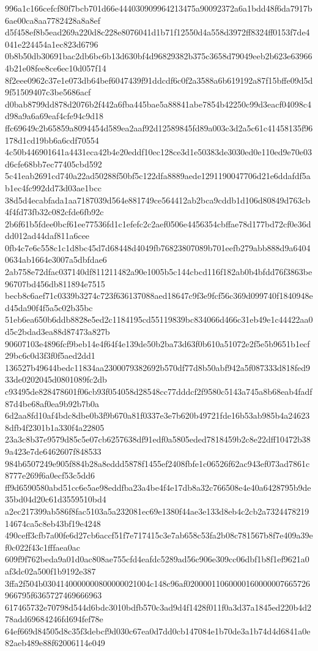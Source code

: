 {996a1c166cefcf80f7bcb701d66e444030909964213475a90092372a6a1bdd48f6da7917b6ae00ca8aa7782428a8a8ef
d5f458ef8b5ead269a220d8c228e8076041d1b71f12550d4a558d3972ff8324ff0153f7de4041e224454a1ec823d6796
0b8b50db30691bac2db6bc6b13d630bf4d96829382b375c3658d79049eeb2b623e639664b21e08fee8ce6ec10d057f14
8f2eee0962c37e1e073db64bef6047439f91ddcdf6c0f2a3588a6b619192a87f15bffe09d5d9f51509407c3be5686acf
d0bab8799dd878d2076b2f442a6fba445bae5a88841abe7854b42250c99d3eacf04098c4d98a9a6a69eaf4cfe94c9d18
ffc69649c2b65859a8094454d589ea2aaf92d12589845fd89a003c3d2a5c61c41458135f96178d1cd19bb6a6cdf70554
4c50b446901641a4431eca42b4e20eddf10ec128ce3d1e50383de3030ed0e110ed9e70e03d6cfe68bb7ec77405cbd592
5c41eab2691cd740a22ad50288f50bf5c122dfa8889aede1291190047706d21e6ddafdf5ab1ec4fc992dd73d03ae1bcc
38d5d4ecabfada1aa7187039d564e881749ce564412ab2bca9cddb1d106d80849d763cb4f4fd73fb32c082cfde6fb92c
2b6f61b5fdee0bcf61ee77536fd1c1efefc2c2aef0506e4456354cbffae78d177bd72cf0e36ddd012ad44daf811a6cee
0fb4c7e6c558c1c1d8bc45d7d68448d4049fb76823807089b701eefb279abb888d9a64040634ab1664e3007a5dbfdae6
2ab758e72dfac037140df811211482a90e1005b5c144cbcd116f182ab0b4bfdd76f3863be96707bd456db811894e7515
becb8c6aef71c0339b3274c723f636137088aed18647c9f3e9fcf56c369d099740f1840948ed45da90f4f5a5c02b35bc
51eb6ea650b6ddb8828e5ed2c1184195cd55119839bc834066d466c31eb49e1c44422aa0d5c2bdad3ea88d87473a827b
90607103e4896fcf9beb14e4f64f4e139de50b2ba73d63f0b610a51072e2f5e5b9651b1ecf29bc6c0d3f3f0f5aed2dd1
136527b49644bedc11834aa2300079382692b570df77d8b50abf942a5f087333d818fed933de0202045d0801089fc2db
c93495de828478601f06cb93f054058d28548cc77dddcf2f9580c5143a745a8b68eab4fadf87d4be68af0ea9b92b7b0a
6d2aa8fd10af4bdc8dbe0b3f9b670a81f0337e3e7b620b49721fde16b53ab985b4a246238dfb4f2301b1a330f4a22805
23a3c8b37e9579d85c5e07cb6257638df91edf0a5805eded7818459b2c8e22dff10472b389a423e7de6462607f848533
984b6507249e905f884b28a8eddd5878f1455ef2408fbfe1c06526f62ac943ef073ad7861c8777e269f6a0ecf53c5dd6
ff9d6590580abd51cc6e5ae98eddfba23a4be4f4e17db8a32c766508e4e40a6428795b9de35bd04d20c61d3559510bd4
a2ec217399ab586f8fac5103a5a232081ec69e1380f44ae3e133d8eb4c2cb2a732447821914674ca5c8eb43bf19e4248
490ceff3cfb7a00fe6d27cb6accf51f7e717415c3e7ab658c53fa2b08c781567b8f7e409a39ef0c022f43c1fffaea0ac
609f9f762beda9a01d0ac808ae755cfd4eafdc5289ad56c906e309cc06dbf1b8f1ef9621a0af3dc02a500f1b9192e387
3ffa2f504b0304140000000800000021004c148c96af02000011060000160000007665726966795f6365727469666963
617465732e70798d544d6bdc3010bdfb570c3ad9d4f1428f011f0a3d37a1845ed220b4d278add69684246fd694fef78e
64ef669d84505d8c35f3debcf9d030c67ea0d7dd0cb147084e1b70de3a1b74d4d6841a0e82aeb489e88f62006114e049
}
